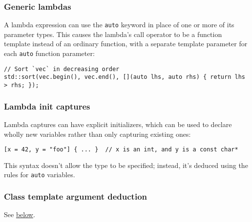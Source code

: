 \subsubsection{Generic lambdas}
A lambda expression can use the \texttt{auto} keyword in place of one or more of its parameter types. This causes the lambda's call operator to be a function template instead of an ordinary function, with a separate template parameter for each \texttt{auto} function parameter:
\begin{verbatim}
// Sort `vec` in decreasing order
std::sort(vec.begin(), vec.end(), [](auto lhs, auto rhs) { return lhs > rhs; });
\end{verbatim}
\subsubsection{Lambda init captures}
Lambda captures can have explicit initializers, which can be used to declare wholly new variables rather than only capturing existing ones:
\begin{verbatim}
[x = 42, y = "foo"] { ... }  // x is an int, and y is a const char*
\end{verbatim}
This syntax doesn't allow the type to be specified; instead, it's deduced using the rules for \texttt{auto} variables.
\subsubsection{Class template argument deduction}
See \hyperref[sec:class-template-argument-deduction]{below}.
